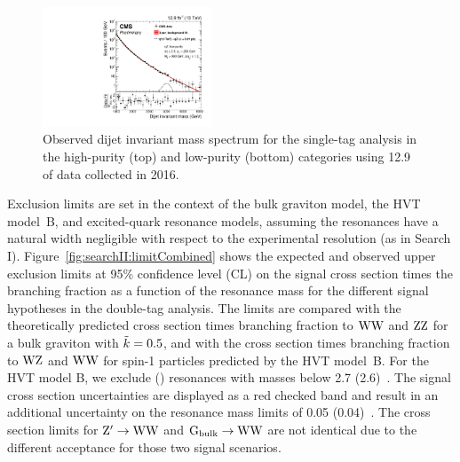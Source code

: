 \begin{figure}[h!]
\includegraphics[width=0.45\textwidth]{figures/analysis/search2/B2G-16-021/figures/mjj/MLBkgFit_DijetMassLowPuriqZ.pdf}
\caption{Observed dijet invariant mass spectrum for the single-tag analysis in the high-purity (top) and low-purity (bottom) categories using 12.9 \fbinv of data collected in 2016.}
\label{fig:searchII:doubleobsmqv}
\end{figure}
\noindent Exclusion limits are set in the context of the bulk graviton model, the HVT model~B, and excited-quark resonance models,
assuming the resonances have a natural width negligible with respect to the experimental resolution (as in Search I). Figure~\ref{fig:searchII:limitCombined} shows the expected and observed upper exclusion limits at 95\% confidence level (CL) on the signal cross section times the branching fraction as a function of the resonance mass for the different signal hypotheses in the double-tag analysis. The limits are compared with the theoretically predicted cross section times branching fraction to $\mathrm{W}\mathrm{W}$ and $\mathrm{Z}\mathrm{Z}$ for a bulk graviton with $\tilde{k} = 0.5$, and with the cross section
times branching fraction to $\mathrm{W}\mathrm{Z}$ and $\mathrm{W}\mathrm{W}$ for spin-1 particles predicted by the HVT model~B. For the HVT model B, we exclude \PWpr (\PZpr) resonances with masses below 2.7 (2.6)~\TeV. The signal cross section uncertainties are displayed as a red checked band and result in an additional uncertainty on the resonance mass limits of 0.05 (0.04)~\TeV.
The cross section limits for $\mathrm{Z}^\prime \rightarrow \mathrm{W}\mathrm{W}$ and $\rm G_{bulk}\rightarrow\mathrm{W}\mathrm{W}$ are not identical due to the different acceptance for those two signal scenarios.
